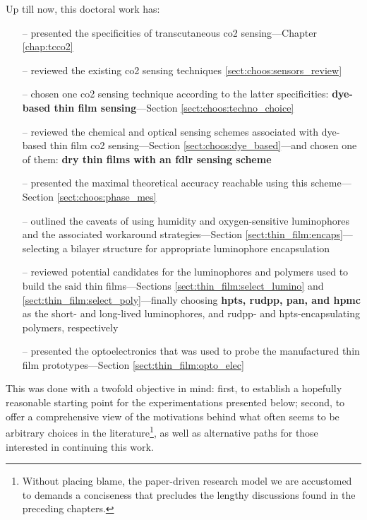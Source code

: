 Up till now, this doctoral work has:
\begin{enumerate}
	\item[--] presented the specificities of transcutaneous \gls{co2} sensing---Chapter \ref{chap:tcco2}
	\item[--] reviewed the existing \gls{co2} sensing techniques \ref{sect:choos:sensors_review}
	\item[--] chosen one \gls{co2} sensing technique according to the latter specificities: \textbf{dye-based thin film sensing}---Section \ref{sect:choos:techno_choice}
	\item[--] reviewed the chemical and optical sensing schemes associated with dye-based thin film \gls{co2} sensing---Section \ref{sect:choos:dye_based}---and chosen one of them: \textbf{dry thin films with an \gls{fdlr} sensing scheme}
	\item[--] presented the maximal theoretical accuracy reachable using this scheme---Section \ref{sect:choos:phase_mes}
	\item[--] outlined the caveats of using humidity and oxygen-sensitive luminophores and the associated workaround strategies---Section \ref{sect:thin_film:encaps}---selecting a bilayer structure for appropriate luminophore encapsulation
	\item[--] reviewed potential candidates for the luminophores and polymers used to build the said thin films---Sections \ref{sect:thin_film:select_lumino} and \ref{sect:thin_film:select_poly}---finally choosing \textbf{\gls{hpts}, \gls{rudpp}, \gls{pan}, and \gls{hpmc}} as the short- and long-lived luminophores, and \gls{rudpp}- and \gls{hpts}-encapsulating polymers, respectively
	\item[--] presented the optoelectronics that was used to probe the manufactured thin film prototypes---Section \ref{sect:thin_film:opto_elec}
\end{enumerate}
This was done with a twofold objective in mind: first, to establish a hopefully reasonable starting point for the experimentations presented below; second, to offer a comprehensive view of the motivations behind what often seems to be arbitrary choices in the literature\footnote{Without placing blame, the paper-driven research model we are accustomed to demands a conciseness that precludes the lengthy discussions found in the preceding chapters.}, as well as alternative paths for those interested in continuing this work.


